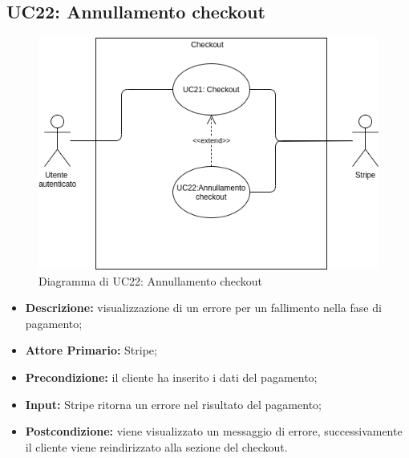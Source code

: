 \subsection{UC22: Annullamento checkout}
\label{sec:UC22}
\begin{figure}[!ht]
    \caption{Diagramma di UC22: Annullamento checkout}
    \vspace{10px}
    \includegraphics[scale=0.5]{../../../Images/AnalisiRequisiti/UC22}
    \centering
\end{figure}
\begin{itemize}
    \item \textbf{Descrizione:} visualizzazione di un errore per un fallimento nella fase di pagamento;
    \item \textbf{Attore Primario:} Stripe;
    \item \textbf{Precondizione:} il cliente ha inserito i dati del pagamento;
    \item \textbf{Input:} Stripe ritorna un errore nel risultato del pagamento;
    \item \textbf{Postcondizione:} viene visualizzato un messaggio di errore, successivamente il cliente viene reindirizzato alla sezione del checkout.
\end{itemize}
